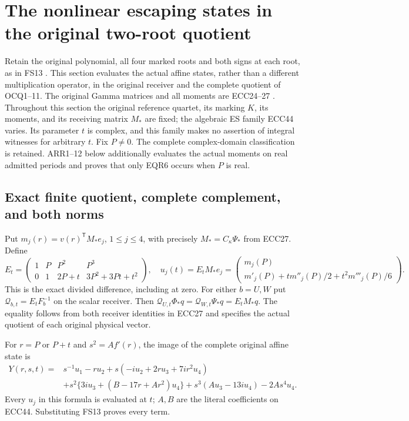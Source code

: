 \documentclass[11pt]{article}
\begin{document}
\section{The nonlinear escaping states in the original two-root quotient}
Retain the original polynomial, all four marked roots and both signs
at each root, as in FS13 \cite{ES488,Tao}. This section evaluates the
actual affine states, rather than a different multiplication operator,
in the original receiver and the complete quotient of OCQ1--11.
The original Gamma matrices and all moments are ECC24--27
\cite{WCF}. Throughout this section the original reference quartet,
its marking $K$, its moments, and its receiving matrix $M_*$ are fixed;
the algebraic ES family ECC44 varies. Its parameter $t$ is complex,
and this family makes no assertion of integral witnesses for arbitrary
$t$. Fix $P\ne0$. The complete complex-domain classification is retained.
ARR1--12 below additionally evaluates the actual moments on real admitted
periods and proves that only EQR6 occurs when $P$ is real.

\subsection{Exact finite quotient, complete complement, and both norms}
Put $m_j(r)=v(r)^{\mathsf T}M_*e_j$, $1\le j\le4$, with precisely
$M_*=C_\kappa\Psi_*$ from ECC27. Define
\[
 E_t=\begin{pmatrix}1&P&P^2&P^3\\
 0&1&2P+t&3P^2+3Pt+t^2\end{pmatrix},\quad
 u_j(t)=E_tM_*e_j=
 \begin{pmatrix}m_j(P)\\m'_j(P)+t m''_j(P)/2+t^2m'''_j(P)/6\end{pmatrix}.
 \tag{EQR1}
\]
This is the exact divided difference, including at zero. For either
$b=U,W$ put $\mathcal Q_{b,t}=E_tF_b^{-1}$ on the scalar receiver.
Then $\mathcal Q_{U,t}\Phi_*q=\mathcal Q_{W,t}\Psi_*q=E_tM_*q$.
The equality follows from both receiver identities in ECC27 and
specifies the actual quotient of each original physical vector.

For $r=P$ or $P+t$ and $s^2=A f'(r)$, the image of the complete
original affine state is
\[
 \begin{aligned}
 Y(r,s,t)={}&s^{-1}u_1-r u_2
 +s(-iu_2+2ru_3+7ir^2u_4)\\
 &+s^2\{3iu_3+(B-17r+Ar^2)u_4\}
 +s^3(Au_3-13iu_4)-2As^4u_4.
 \end{aligned}\tag{EQR2}
\]
Every $u_j$ in this formula is evaluated at $t$; $A,B$ are the
literal coefficients on ECC44. Substituting FS13 proves every term.
\end{document}
